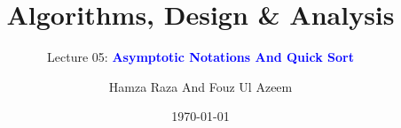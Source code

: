 \documentclass[10pt,aspectratio=43]{beamer}
\title{Algorithms, Design \& Analysis}
\subtitle{Lecture 05: \textcolor{blue}{\textbf{Asymptotic Notations And Quick Sort}}}
\author[BSCS23177 & BSCS23095 ]{Hamza Raza And Fouz Ul Azeem}
\institute[ITU]{Information Technology University}
\date{\today}
\begin{document}
\begin{frame}
    \titlepage
\end{frame}


\end{document}
